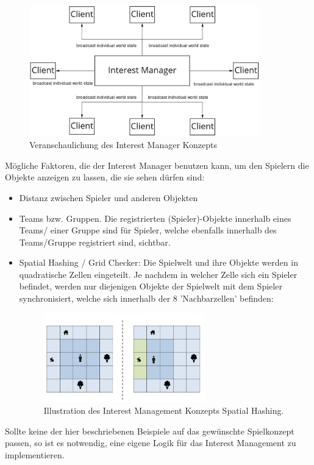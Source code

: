 \begin{figure}[H]
	\centering
	\includegraphics[width=100mm]{images/Interest_Manager.jpg}
	\caption[Interest Manager]{Veranschaulichung des Interest Manager Konzepts}
	\label{pic:Interest_Manager}
\end{figure}

Mögliche Faktoren, die der Interest Manager benutzen kann, um den Spielern die Objekte anzeigen zu lassen, die sie sehen dürfen sind:

\begin{itemize}
	\item Distanz zwischen Spieler und anderen Objekten
	\item Teams bzw. Gruppen. Die registrierten (Spieler)-Objekte innerhalb eines Teams/ einer Gruppe sind für Spieler, welche ebenfalls innerhalb des Teams/Gruppe registriert sind, sichtbar.
	\item Spatial Hashing / Grid Checker: Die Spielwelt und ihre Objekte werden in quadratische Zellen eingeteilt. Je nachdem in welcher Zelle sich ein Spieler befindet, werden nur diejenigen Objekte der Spielwelt mit dem Spieler synchronisiert, welche sich innerhalb der 8 'Nachbarzellen' befinden: 
	\begin{figure}[H]
		\centering
		\includegraphics[width=70mm]{images/interest_management.png}
		\caption[Spatial Hashing]{Illustration des Interest Management Konzepts Spatial Hashing. \cite{JeromeRenaux.2017} }
		\label{pic:interest_management}
	\end{figure}
\end{itemize}

Sollte keine der hier beschriebenen Beispiele auf das gewünschte Spielkonzept passen, so ist es notwendig, eine eigene Logik für das Interest Management zu implementieren.
